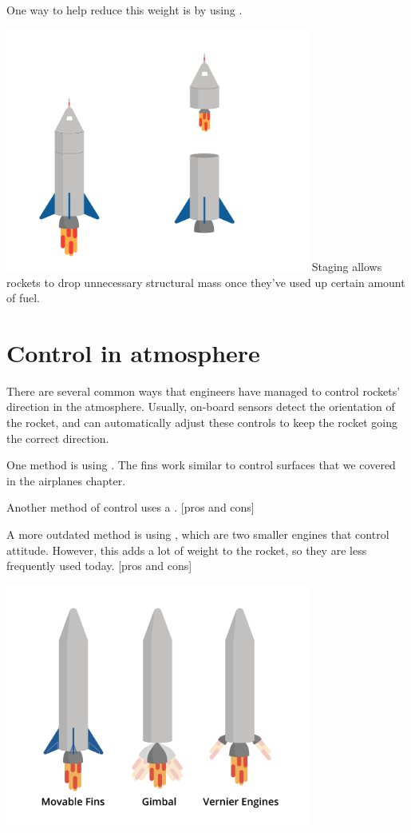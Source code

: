 	One way to help reduce this weight is by using . 

\includegraphics[width=0.75\textwidth]{stagingDual.png}
	Staging allows rockets to drop unnecessary structural mass once they've used up certain amount of fuel. 



\section{Control in atmosphere}

There are several common ways that engineers have managed to control rockets' direction in the atmosphere. Usually, on-board sensors detect the orientation of the rocket, and can automatically adjust these controls to keep the rocket going the correct direction.

	
	One method is using . The fins work similar to control surfaces that we covered in the airplanes chapter. 



	Another method of control uses a . [pros and cons]
	
	A more outdated method is using , which are two smaller engines that control attitude. However, this adds a lot of weight to the rocket, so they are less frequently used today. [pros and cons]


\includegraphics[width=0.75\textwidth]{control.png}


